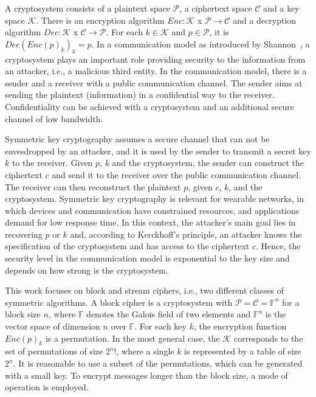 A cryptosystem consists of a plaintext space $\mathcal{P}$, a ciphertext space $\mathcal{C}$ and a key space $\mathcal{K}$. There is an encryption algorithm $Enc: \mathcal{K}$ x $\mathcal{P} \rightarrow \mathcal{C}$ and a decryption algorithm $Dec: \mathcal{K}$ x $\mathcal{C} \rightarrow \mathcal{P}$. For each $k \in \mathcal{K}$ and $p \in \mathcal{P}$, it is $Dec(Enc(p)_k)_k = p$. In a communication model as introduced by Shannon~\cite{shannon}, a cryptosystem plays an important role providing security to the information from an attacker, i.e., a malicious third entity. In the communication model, there is a sender and a receiver with a public communication channel. The sender aims at sending the plaintext (information) in a confidential way to the receiver. Confidentiality can be achieved with a cryptosystem and an additional secure channel of low bandwidth.  

Symmetric key cryptography assumes a secure channel that can not be eavesdropped by an attacker, and it is used by the sender to transmit a secret key $k$ to the receiver. Given $p$, $k$ and the cryptosystem, the sender can construct the ciphertext $c$ and send it to the receiver over the public communication channel. The receiver can then reconstruct the plaintext $p$, given $c$, $k$, and the cryptosystem. 
Symmetric key cryptography 
is relevant for wearable networks, in which devices and communication have constrained resources, and applications demand for low response time. %
In this context, the attacker's main goal lies in recovering $p$ or $k$ and, according to Kerckhoff’s principle, an attacker knows the specification of the cryptosystem and has access to the ciphertext $c$. Hence, the security level in the communication model is exponential to the key size and depends on how strong is the cryptosystem. %

This work focuses on block and stream ciphers, i.e., two different classes of symmetric algorithms. A block cipher is a cryptosystem with $\mathcal{P} = \mathcal{C} =  \mathbb{F}^n$ for a block size $n$, where  $\mathbb{F}$ denotes the Galois field of two elements and $\mathbb{F}^n$ is the vector space of dimension $n$ over $\mathbb{F}$. For each key $k$, the encryption function $Enc(p)_k$ is a permutation. In the most general case, the $\mathcal{K}$ corresponds to the set of permutations of size $2^n!$, where a single $k$ is represented by a table of size $2^n$. It is reasonable to use a subset of the permutations, which can
be generated with a small key. To encrypt messages longer than the block size,
a mode of operation is employed. 

